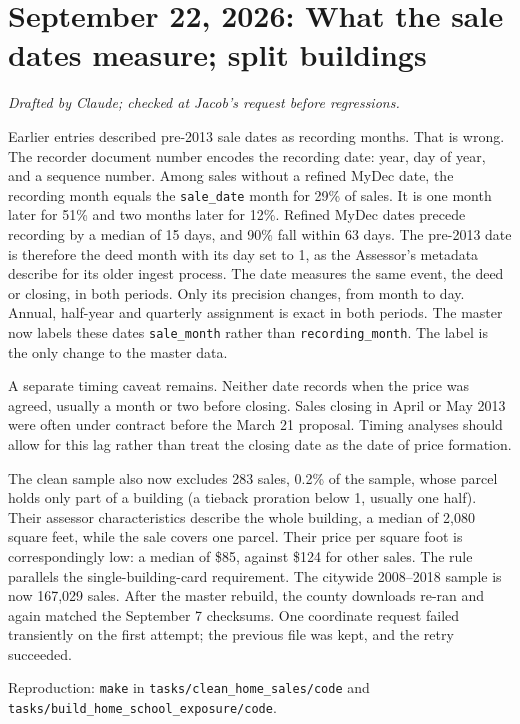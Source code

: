 \section*{September 22, 2026: What the sale dates measure; split buildings}
\textit{Drafted by Claude; checked at Jacob's request before regressions.}

Earlier entries described pre-2013 sale dates as recording months. That is
wrong. The recorder document number encodes the recording date: year, day of
year, and a sequence number. Among sales without a refined MyDec date, the
recording month equals the \texttt{sale\_date} month for 29\% of sales. It is
one month later for 51\% and two months later for 12\%. Refined MyDec dates
precede recording by a median of 15 days, and 90\% fall within 63 days. The
pre-2013 date is therefore the deed month with its day set to 1, as the
Assessor's metadata describe for its older ingest process. The date measures
the same event, the deed or closing, in both periods. Only its precision
changes, from month to day. Annual, half-year and quarterly assignment is
exact in both periods. The master now labels these dates \texttt{sale\_month}
rather than \texttt{recording\_month}. The label is the only change to the
master data.

A separate timing caveat remains. Neither date records when the price was
agreed, usually a month or two before closing. Sales closing in April or May
2013 were often under contract before the March 21 proposal. Timing analyses
should allow for this lag rather than treat the closing date as the date of
price formation.

The clean sample also now excludes 283 sales, 0.2\% of the sample, whose parcel
holds only part of a building (a tieback proration below 1, usually one half).
Their assessor characteristics describe the whole building, a median of 2,080
square feet, while the sale covers one parcel. Their price per square foot is
correspondingly low: a median of \$85, against \$124 for other sales. The
rule parallels the single-building-card requirement. The citywide 2008--2018
sample is now 167,029 sales. After the master rebuild, the county downloads
re-ran and again matched the September 7 checksums. One coordinate request
failed transiently on the first attempt; the previous file was kept, and the
retry succeeded.

\small
Reproduction: \texttt{make} in \texttt{tasks/clean\_home\_sales/code} and
\texttt{tasks/build\_home\_school\_exposure/code}.
\normalsize
